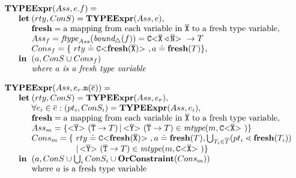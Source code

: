 \documentclass[runningheads]{llncs}
\begin{document}
\smallskip

$\begin{array}{@{}l@{}l@{}l}
\textbf{TY}& \textbf{PE} & \textbf{Expr} (Ass, e.f ) = \\
& \textbf{let} %
& (rty, ConS) = \textbf{TYPEExpr}(Ass, e),\\
& & \textbf{fresh} = \text{a mapping from each variable in}\ \ol{X} \ \text{to a fresh type variable},\\
& & Ass_{f} = \textit{ftype}_{Ass}(\textit{bound}_\triangle(f)) = \exptype{C}{\ol{X} \triangleleft \ol{N}} \to T \\
& & Cons_{f} = \{\ rty \doteq \exptype{C}{\textbf{fresh}(\ol{X})}, a \doteq \textbf{fresh}(T)\},\\
& \mathbf{in}%
& (a, ConS \cup Cons_{f})\\
& & \mathit{where\ } a \mathit{\ is\ a\ fresh\
  type\ variable}\\ 
\end{array}
$

\smallskip

$\begin{array}{@{}l@{}l@{}l}
\textbf{TY}& \textbf{PE} & \textbf{Expr} (Ass, e_r.\mathtt{m}(\overline{e}) ) = \\
& \textbf{let} %
& (rty, ConS) = \textbf{TYPEExpr}(Ass, e_r),\\
& & \forall e_i \in \overline{e} : (pt_i, ConS_i) = \textbf{TYPEExpr}(Ass, e_i)  ,\\
& & \textbf{fresh} = \text{a mapping from each variable in}\ \ol{X} \ \text{to a fresh type variable},\\
& & Ass_{m} =  \set{\exptype{}{\ol{Y}} (\ol{T} \to T) \,|\, \exptype{}{\ol{Y}} (\ol{T} \to T) \in \textit{mtype}(m, \exptype{C}{\ol{X}})} \\
& & \begin{array}{@{}l@{}l}
        Cons_{m} = \{\ & rty \doteq \exptype{C}{\textbf{fresh}(\ol{X})}, a \doteq \textbf{fresh}(T), \bigcup_{T_i \in \overline{T}} (pt_i \lessdot \textbf{fresh}(T_i))\\
                    & |\, \exptype{}{\ol{Y}} (\ol{T} \to T) \in \textit{mtype}(m, \exptype{C}{\ol{X}}) \} %
    \end{array}\\
& \mathbf{in}%
& (a, ConS \cup \bigcup_i ConS_i \cup \textbf{OrConstraint}(Cons_{m}))\\
& & \text{where\ } a \text{\ is\ a\ fresh\
  type\ variable}\\ 
\end{array}
$
\end{document}
